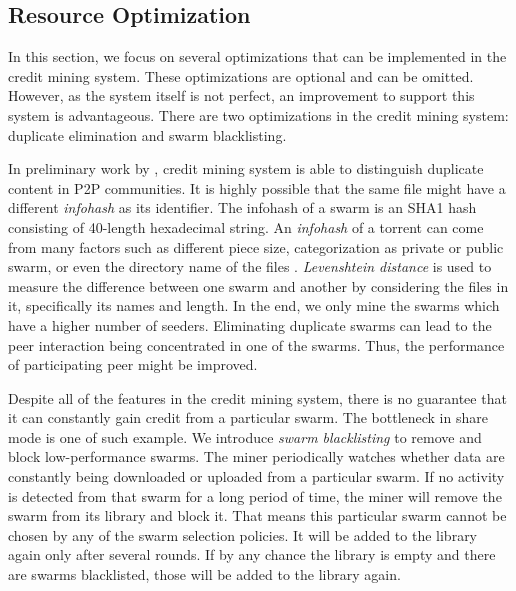\subsection{Resource Optimization}
\label{section:optimization}
In this section, we focus on several optimizations that can be implemented in the credit mining system. These optimizations are optional and can be omitted. However, as the system itself is not perfect, an improvement to support this system is advantageous. There are two optimizations in the credit mining system: duplicate elimination and swarm blacklisting.%

In preliminary work by \citeauthor{2015:creditmining:capota}, credit mining system is able to distinguish duplicate content in P2P communities. It is highly possible that the same file might have a different \textit{infohash} as its identifier. The infohash of a swarm is an SHA1 hash consisting of 40-length hexadecimal string. An \textit{infohash} of a torrent can come from many factors such as different piece size, categorization as private or public swarm, or even the directory name of the files \cite{2015:creditmining:capota}. \textit{Levenshtein distance} is used to measure the difference between one swarm and another by considering the files in it, specifically its names and length. In the end, we only mine the swarms which have a higher number of seeders. Eliminating duplicate swarms can lead to the peer interaction being concentrated in one of the swarms. Thus, the performance of participating peer might be improved.

Despite all of the features in the credit mining system, there is no guarantee that it can constantly gain credit from a particular swarm. The bottleneck in share mode is one of such example. We introduce \textit{swarm blacklisting} to remove and block low-performance swarms. The miner periodically watches whether data are constantly being downloaded or uploaded from a particular swarm. If no activity is detected from that swarm for a long period of time, the miner will remove the swarm from its library and block it. That means this particular swarm cannot be chosen by any of the swarm selection policies. It will be added to the library again only after several rounds. If by any chance the library is empty and there are swarms blacklisted, those will be added to the library again.

